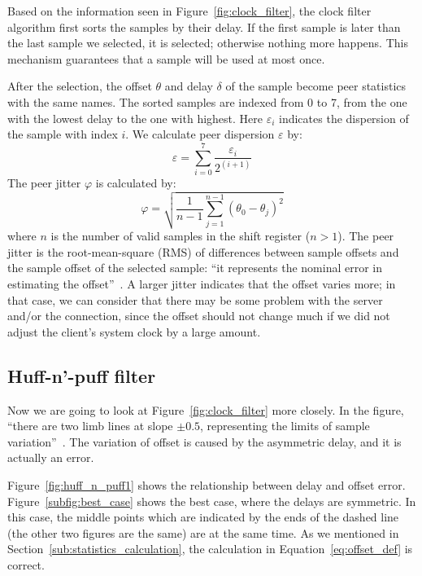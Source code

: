 Based on the information seen in Figure~\ref{fig:clock_filter}, the clock filter
algorithm first sorts the samples by their delay. If the first sample is later
than the last sample we selected, it is selected; otherwise nothing more
happens. This mechanism guarantees that a sample will be used at most
once.

After the selection, the offset $\theta$ and delay $\delta$ of the sample
become peer statistics with the same names. The sorted samples are indexed from
0 to 7, from the one with the lowest delay to the one with highest. Here
$\varepsilon_i$ indicates the dispersion of the sample with index $i$. We
calculate peer dispersion $\varepsilon$ by:
\begin{equation}
    \varepsilon = \sum^{7}_{i=0} \frac{\varepsilon_i}{2^{(i+1)}}
    \label{eq:peer_dispersion}
\end{equation}
The peer jitter $\varphi$ is calculated by:
\begin{equation}
    \varphi = \sqrt{\frac{1}{n-1} \sum^{n-1}_{j=1} (\theta_0 - \theta_j)^2}
    \label{eq:peer_jitter}
\end{equation}
where $n$ is the number of valid samples in the shift register ($n > 1$).
The peer jitter is the root-mean-square (RMS) of differences between sample
offsets and the sample offset of the selected sample: ``it represents the
nominal error in estimating the offset''~\cite{rfc5905}. A larger jitter
indicates that the offset varies more; in that case, we can consider that there
may be some problem with the server and/or the connection, since the offset
should not change much if we did not adjust the client's system clock by a
large amount.

\subsection{Huff-n'-puff filter}%
\label{sub:huff_n_puff_filter}
Now we are going to look at Figure~\ref{fig:clock_filter} more closely. In the
figure, ``there are two limb lines at slope $\pm0.5$, representing the
limits of sample variation''~\cite{clock_filter}.
The variation of offset is caused by the asymmetric delay, and it is actually
an error.

Figure~\ref{fig:huff_n_puff1} shows the relationship between
delay and offset error.  Figure~\ref{subfig:best_case} shows the best case,
where the delays are symmetric. In this case, the middle points which are
indicated by the ends of the dashed line (the other two figures are the same)
are at the same time. As we mentioned in
Section~\ref{sub:statistics_calculation}, the calculation in
Equation~\ref{eq:offset_def} is correct. 

